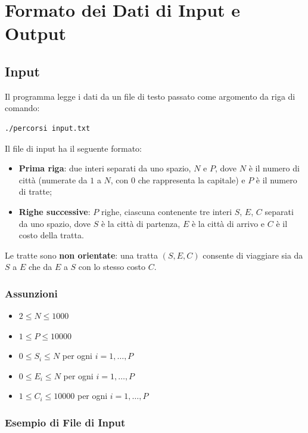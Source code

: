 \chapter{Formato dei Dati di Input e Output}

\section{Input}

Il programma legge i dati da un file di testo passato come argomento 
da riga di comando:

\begin{lstlisting}
./percorsi input.txt
\end{lstlisting}

Il file di input ha il seguente formato:

\begin{itemize}
    \item \textbf{Prima riga}: due interi separati da uno spazio, 
    $N$ e $P$, dove $N$ è il numero di città (numerate da $1$ a $N$, 
    con $0$ che rappresenta la capitale) e $P$ è il numero di tratte;
    \item \textbf{Righe successive}: $P$ righe, ciascuna contenente 
    tre interi $S$, $E$, $C$ separati da uno spazio, dove $S$ è la 
    città di partenza, $E$ è la città di arrivo e $C$ è il costo 
    della tratta.
\end{itemize}

Le tratte sono \textbf{non orientate}: una tratta $(S, E, C)$ consente 
di viaggiare sia da $S$ a $E$ che da $E$ a $S$ con lo stesso costo $C$.

\subsection{Assunzioni}

\begin{itemize}
    \item $2 \leq N \leq 1000$
    \item $1 \leq P \leq 10000$
    \item $0 \leq S_i \leq N$ per ogni $i = 1, \ldots, P$
    \item $0 \leq E_i \leq N$ per ogni $i = 1, \ldots, P$
    \item $1 \leq C_i \leq 10000$ per ogni $i = 1, \ldots, P$
\end{itemize}

\subsection{Esempio di File di Input}

